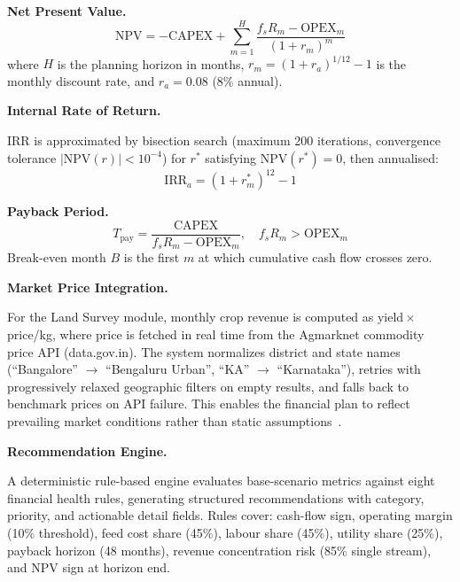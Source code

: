 \documentclass[conference]{IEEEtran}
\begin{document}
\medskip
\noindent\textbf{Net Present Value.}
\begin{equation}
  \mathrm{NPV} = -\mathrm{CAPEX} +
    \sum_{m=1}^{H}
      \frac{f_s R_m - \mathrm{OPEX}_m}{(1+r_m)^{m}}
  \label{eq:npv}
\end{equation}
where $H$ is the planning horizon in months,
$r_m = (1+r_a)^{1/12}-1$ is the monthly discount rate,
and $r_a = 0.08$ (8\% annual).

\medskip
\noindent\textbf{Internal Rate of Return.}

\noindent IRR is approximated by bisection search (maximum 200
iterations, convergence tolerance $|\mathrm{NPV}(r)| < 10^{-4}$)
for $r^*$ satisfying $\mathrm{NPV}(r^*)=0$, then annualised:
\begin{equation}
  \mathrm{IRR}_a = (1 + r^*_m)^{12} - 1
  \label{eq:irr}
\end{equation}

\medskip
\noindent\textbf{Payback Period.}
\begin{equation}
  T_{\mathrm{pay}} = \frac{\mathrm{CAPEX}}{f_s R_m - \mathrm{OPEX}_m},
  \quad f_s R_m > \mathrm{OPEX}_m
  \label{eq:payback}
\end{equation}
Break-even month $B$ is the first $m$ at which cumulative cash flow
crosses zero.

\medskip
\noindent\textbf{Market Price Integration.}

\noindent For the Land Survey module, monthly crop revenue is computed
as yield\,$\times$\,price/kg, where price is fetched in real time from
the Agmarknet commodity price API (data.gov.in). The system normalizes
district and state names (``Bangalore'' $\rightarrow$ ``Bengaluru Urban'',
``KA'' $\rightarrow$ ``Karnataka''), retries with progressively relaxed
geographic filters on empty results, and falls back to benchmark prices
on API failure. This enables the financial plan to reflect prevailing
market conditions rather than static assumptions~\cite{ref11,ref17}.

\medskip
\noindent\textbf{Recommendation Engine.}

\noindent A deterministic rule-based engine evaluates base-scenario
metrics against eight financial health rules, generating structured
recommendations with category, priority, and actionable detail fields.
Rules cover: cash-flow sign, operating margin (10\% threshold), feed
cost share (45\%), labour share (45\%), utility share (25\%), payback
horizon (48 months), revenue concentration risk (85\% single stream),
and NPV sign at horizon end.
\end{document}
